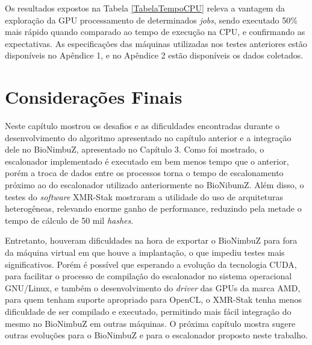 Os resultados expostos na Tabela \ref{TabelaTempoCPU} releva a vantagem da exploração da \acrshort{GPU} processamento de determinados \textit{jobs}, sendo executado 50\% mais rápido quando comparado ao tempo de execução na \acrshort{CPU}, e confirmando as expectativas. As especificações das máquinas utilizadas nos testes anteriores estão disponíveis no Apêndice 1, e no Apêndice 2 estão disponíveis os dados coletados.

\section{Considerações Finais}

Neste capítulo mostrou os desafios e as dificuldades encontradas durante o desenvolvimento do algoritmo apresentado no capítulo anterior e a integração dele no BioNimbuZ, apresentado no Capítulo 3. Como foi mostrado, o escalonador implementado é executado em bem menos tempo que o anterior, porém a troca de dados entre os processos torna o tempo de escalonamento próximo ao do escalonador utilizado anteriormente no BioNibumZ. Além disso, o testes do \textit{software} XMR-Stak mostraram a utilidade do uso de arquiteturas heterogêneas, relevando enorme ganho de performance, reduzindo pela metade o tempo de cálculo de 50 mil \textit{hashes}.

Entretanto, houveram dificuldades na hora de exportar o BioNimbuZ para fora da máquina virtual em que houve a implantação, o que impediu testes mais significativos. Porém é possível que esperando a evolução da tecnologia \acrshort{CUDA}, para facilitar o processo de compilação do escalonador no sistema operacional \acrshort{GNU}/Linux, e também o desenvolvimento do \textit{driver} das \acrshort{GPU}s da marca \acrshort{AMD}, para quem tenham suporte apropriado para OpenCL, o XMR-Stak tenha menos dificuldade de ser compilado e executado, permitindo mais fácil integração do mesmo no BioNimbuZ em outras máquinas. O próxima capítulo mostra sugere outras evoluções para o BioNimbuZ e para o escalonador proposto neste trabalho.
